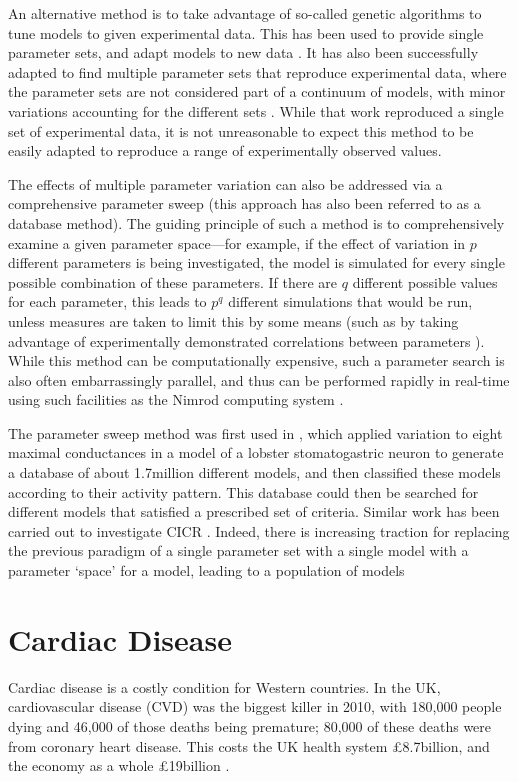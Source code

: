\documentclass[../thesis-main.tex]{subfiles}
\begin{document}
 An alternative method is to take advantage of so-called genetic algorithms to tune models to given experimental data. This has been used to provide single parameter sets, and adapt models to new data \citep{Kherlopian2011}. It has also been successfully adapted to find multiple parameter sets that reproduce experimental data, where the parameter sets are not considered part of a continuum of models, with minor variations accounting for the different sets \citep{Achard2006, Syed2005}. While that work reproduced a single set of experimental data, it is not unreasonable to expect this method to be easily adapted to reproduce a range of experimentally observed values.
 
 The effects of multiple parameter variation can also be addressed via a comprehensive parameter sweep (this approach has also been referred to as a database method). The guiding principle of such a method is to comprehensively examine a given parameter space---for example, if the effect of variation in $p$ different parameters is being investigated, the model is simulated for every single possible combination of these parameters. If there are $q$ different possible values for each parameter, this leads to $p^q$ different simulations that would be run, unless measures are taken to limit this by some means (such as by taking advantage of experimentally demonstrated correlations between parameters \citep{Schulz2006}). While this method can be computationally expensive, such a parameter search is also often embarrassingly parallel, and thus can be performed rapidly in real-time using such facilities as the Nimrod computing system \citep{Abramson2000, Abramson1997, Abramson2010}.
 
 The parameter sweep method was first used in \citet{Prinz2003}, which applied variation to eight maximal conductances in a model of a lobster stomatogastric neuron to generate a database of about 1.7million different models, and then classified these models according to their activity pattern. This database could then be searched for different models that satisfied a prescribed set of criteria. Similar work has been carried out to investigate CICR \citep{Sobie2009b}. Indeed, there is increasing traction for replacing the previous paradigm of a single parameter set with a single model with a parameter `space' for a model, leading to a population of models \citep{Davies2012, Taylor2009, Prinz2003, Marder2011}
 
 \section{Cardiac Disease}
 \label{sec:disease}
 Cardiac disease is a costly condition for Western countries. In the UK, cardiovascular disease (CVD) was the biggest killer in 2010, with 180,000 people dying and 46,000 of those deaths being premature; 80,000 of these deaths were from coronary heart disease. This costs the UK health system \pounds8.7billion, and the economy as a whole \pounds19billion \citep{Townsend2012}.
 
\end{document}
